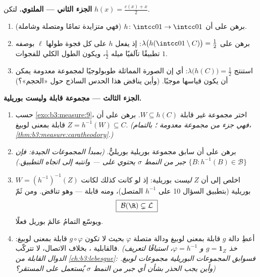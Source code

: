 \begin{problem}
\medskip
\noindent\textbf{الجزء الثاني ---  الملتوي.}
لتكن $h(x) = \frac{c(x) + x}{2}$.
\begin{enumerate}[resume]
  \item برهن على أن $h \colon \intcc01 \to \intcc01$  (فهي متزايدة تمامًا
        ومتصلة وشاملة).
  \item برهن على $\lambda\bigl(h(\intcc01\setminus C)\bigr) =
        \tfrac12$: إذ يفعل $h$ على كل فجوة طولها $\ell$
        بوصفه تطبيقًا تآلفيًا ميله $\tfrac12$، ويكون الطول الكلي
        للفجوات $1$.
  \item استنتج $\lambda\bigl(h(C)\bigr) = \tfrac12$: أي إن الصورة المماثلة طوبولوجيًا
        لمجموعة معدومة  يمكن أن يكون قياسها موجبًا. (وأين
        يناقض هذا الحدس الساذج حول «الحجم»؟)
\end{enumerate}

\medskip
\noindent\textbf{الجزء الثالث --- مجموعة قابلة  وليست
بوريلية.}
\begin{enumerate}[resume]
  \item حسب \cref{exo:b3:measure:9}، اختر مجموعة غير قابلة  $W
        \subseteq h(C)$.
        برهن على أن $Z = h^{-1}(W) \subseteq C$ قابلة  بمعنى لوبيغ. \emph{(فهي
        جزء من مجموعة معدومة ؛ بالتمام، \cref{thm:b3:measure:caratheodory}.)}
  \item برهن على أن سابق مجموعة بوريلية  بوريليٌّ.
        \emph{(بمبدأ المجموعات الجيدة: فإن $\{B : h^{-1}(B) \in \mathcal B\}$ جبر من النمط
        $\sigma$ يحتوي على  --- وانتبه إلى
        اتجاه التطبيق.)}
  \item اخلص إلى أن $Z$ \emph{ليست} بوريلية: إذ لو كانت كذلك
        لكانت $W = (h^{-1})^{-1}(Z)$ بوريلية (بتطبيق السؤال 10 على $h^{-1}$
        المتصل)، ومنه قابلة  --- وهو تناقض. ومن ثَمّ
        \[
        \boxed{\ \mathcal B(\R) \subsetneq \mathcal L\ }
        \]
        ويوسّع التمامُ عالمَ بوريل فعلًا.
  \item أعطِ دالة $g$ قابلة  بمعنى لوبيغ ودالة متصلة
        $\varphi$ بحيث لا تكون $g \circ
        \varphi$ قابلة  بمعنى لوبيغ:
        فالقابلية ، بخلاف الاتصال، لا تتركّب. \emph{(خذ
        $g =
        \mathbf 1_Z$ و $\varphi = h^{-1}$، استباقًا لتعريف الدوال القابلة 
        من \cref{ch:b3:lebesgue}: فسوابق المجموعات البوريلية مجموعات لوبيغ.
        وأين يجب الحذر بشأن أي جبر من النمط $\sigma$ يُستعمل على
        المستقر؟)}
\end{enumerate}


\end{problem}
